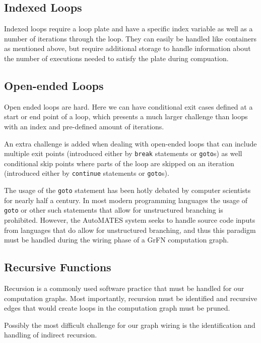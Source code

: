 \subsection{Indexed Loops\label{sec:idx_loops}}
Indexed loops require a loop plate and have a specific index variable as well as a number of iterations through the loop. They can easily be handled like containers as mentioned above, but require additional storage to handle information about the number of executions needed to satisfy the plate during compuation.

\subsection{Open-ended Loops\label{sec:open_loops}}
Open ended loops are hard. Here we can have conditional exit cases defined at a start or end point of a loop, which presents a much larger challenge than loops with an index and pre-defined amount of iterations.

An extra challenge is added when dealing with open-ended loops that can include multiple exit points (introduced either by \texttt{break} statements or \texttt{goto}s) as well conditional skip points where parts of the loop are skipped on an iteration (introduced either by \texttt{continue} statements or \texttt{goto}s).

The usage of the \texttt{goto} statement has been hotly debated by computer scientists for nearly half a century. In most modern programming languages the usage of  \texttt{goto} or other such statements that allow for unstructured branching is prohibited. However, the AutoMATES system seeks to handle source code inputs from languages that do allow for unstructured branching, and thus this paradigm must be handled during the wiring phase of a GrFN computation graph.

\subsection{Recursive Functions\label{sec:rec_func}}
Recursion is a commonly used software practice that must be handled for our computation graphs. Most importantly, recursion must be identified and recursive edges that would create loops in the computation graph must be pruned.

Possibly the most difficult challenge for our graph wiring is the identification and handling of indirect recursion.

